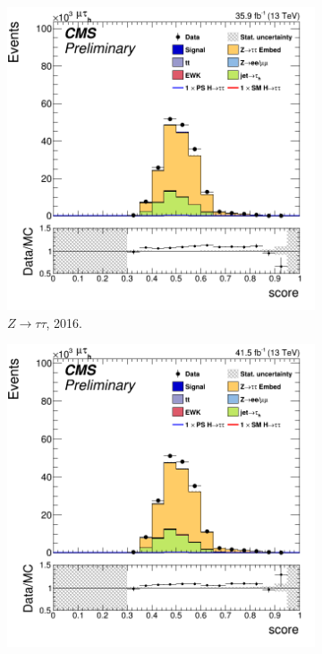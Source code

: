 \begin{figure}[!ht]
    \begin{subfigure}[b]{0.33\linewidth}
    \centering
    \includegraphics[width=\linewidth]{Chapitre7/Images/CtrlPlots/2016/BDTscoreZTT.png} 
    \caption{$Z\to\tau\tau$, 2016.} 
    \vspace{0.5cm}
  \end{subfigure}%
  \begin{subfigure}[b]{0.33\linewidth}
    \centering
    \includegraphics[width=\linewidth]{Chapitre7/Images/CtrlPlots/2017/BDTscoreZTT.png} 

\end{subfigure}
\end{figure}
